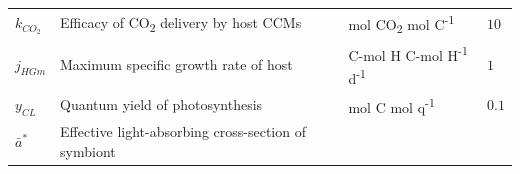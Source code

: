 \documentclass[]{elsarticle} %
\begin{document}
\begin{longtable}[]{@{}llll@{}}
\begin{minipage}[t]{0.09\columnwidth}
\(k_{CO_2}\)\strut
\end{minipage} & \begin{minipage}[t]{0.46\columnwidth}\raggedright\strut
Efficacy of CO\textsubscript{2} delivery by host CCMs\strut
\end{minipage} & \begin{minipage}[t]{0.24\columnwidth}\raggedright\strut
mol CO\textsubscript{2} mol C\textsuperscript{-1}\strut
\end{minipage} & \begin{minipage}[t]{0.09\columnwidth}\raggedright\strut
\(10\)\strut
\end{minipage}\tabularnewline
\begin{minipage}[t]{0.09\columnwidth}\raggedright\strut
\(j_{HGm}\)\strut
\end{minipage} & \begin{minipage}[t]{0.46\columnwidth}\raggedright\strut
Maximum specific growth rate of host\strut
\end{minipage} & \begin{minipage}[t]{0.24\columnwidth}\raggedright\strut
C-mol H C-mol H\textsuperscript{-1} d\textsuperscript{-1}\strut
\end{minipage} & \begin{minipage}[t]{0.09\columnwidth}\raggedright\strut
\(1\)\strut
\end{minipage}\tabularnewline
\begin{minipage}[t]{0.09\columnwidth}\raggedright\strut
\(y_{CL}\)\strut
\end{minipage} & \begin{minipage}[t]{0.46\columnwidth}\raggedright\strut
Quantum yield of photosynthesis\strut
\end{minipage} & \begin{minipage}[t]{0.24\columnwidth}\raggedright\strut
mol C mol q\textsuperscript{-1}\strut
\end{minipage} & \begin{minipage}[t]{0.09\columnwidth}\raggedright\strut
\(0.1\)\strut
\end{minipage}\tabularnewline
\begin{minipage}[t]{0.09\columnwidth}\raggedright\strut
\(\bar{a}^*\)\strut
\end{minipage} & \begin{minipage}[t]{0.46\columnwidth}\raggedright\strut
Effective light-absorbing cross-section of symbiont\strut
\end{minipage} & \begin{minipage}[t]{0.24\columnwidth}\raggedright\strut

\end{minipage}
\end{longtable}
\end{document}
